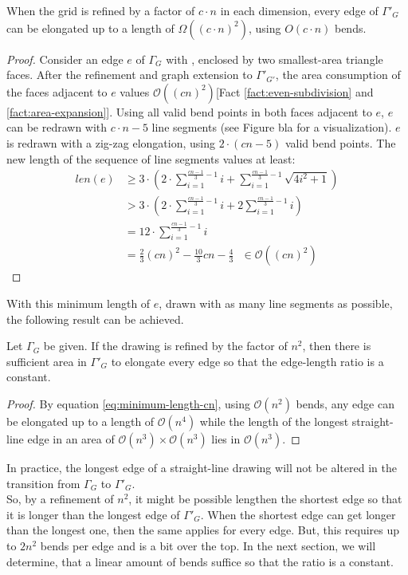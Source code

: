 \begin{lemma}\label{lemma:minimum-length}
\end{lemma}
When the grid is refined by a factor of $c\cdot n$ in each dimension, every edge of $\Gamma'_G$ can be elongated up to a length of $\Omega((c\cdot n)^2)$, using $O(c\cdot n)$ bends.
\begin{proof}
	Consider an edge $e$ of $\Gamma_G$ with \UL, enclosed by two smallest-area triangle faces. After the refinement and graph extension to $\Gamma'_{G'}$, the area consumption of the faces adjacent to $e$ values $\mathcal{O}((cn)^2)$[Fact \ref{fact:even-subdivision} and \ref{fact:area-expansion}]. Using all valid bend points in both faces adjacent to $e$, $e$ can be redrawn with $c\cdot n - 5$ line segments 
	(see Figure bla for a visualization). $e$ is redrawn with a zig-zag elongation, using $2\cdot (cn-5)$ valid bend points. The new length of the sequence of line segments values at least:
	\begin{align}
		len(e) &\geq 3\cdot \left(2\cdot \sum_{i=1}^{\frac{cn-1}{3}-1}i + \sum_{i=1}^{\frac{cn-1}{3}-1}\sqrt{4i^2+1}\right)\\
		&> 3\cdot \left(2\cdot \sum_{i=1}^{\frac{cn-1}{3}-1}i + 2 \sum_{i=1}^{\frac{cn-1}{3}-1}i\right)\\
		&= 12 \cdot \sum_{i=1}^{\frac{cn-1}{3}-1}i\\
		&= \frac{2}{3}(cn)^2-\frac{10}{3}cn-\frac{4}{3}~~~\in \mathcal{O}((cn)^2)\label{eq:minimum-length-cn}
	\end{align}
\end{proof}
\bigskip

With this minimum length of $e$, drawn with as many line segments as possible, the following result can be achieved.
\begin{theorem}
	Let $\Gamma_G$ be given. If the drawing is refined by the factor of $n^2$, then there is sufficient area in $\Gamma'_G$ to elongate every edge so that the edge-length ratio is a constant.
\end{theorem}
\begin{proof}
	By equation \ref{eq:minimum-length-cn}, using $\mathcal{O}(n^2)$ bends, any edge can be elongated up to a length of $\mathcal{O}(n^4)$ while the length of the longest straight-line edge in an area of $\mathcal{O}(n^3)\times\mathcal{O}(n^3)$ lies in $\mathcal{O}(n^3)$.
\end{proof}

\bigskip
In practice, the longest edge of a straight-line drawing will not be altered in the transition from $\Gamma_G$ to $\Gamma'_G$.\\
So, by a refinement of $n^2$, it might be possible lengthen the shortest edge so that it is longer than the longest edge of $\Gamma'_G$. When the shortest edge can get longer than the longest one, then the same applies for every edge. But, this requires up to $2n^2$ bends per edge and is a bit over the top. In the next section, we will determine, that a linear amount of bends suffice so that the ratio is a constant.
